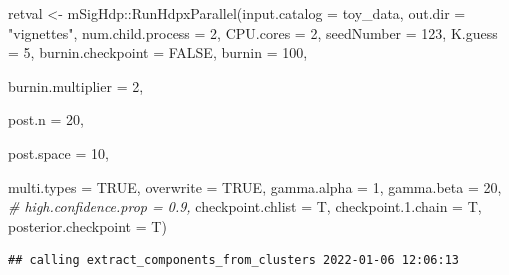 \documentclass[
]{article}
\newenvironment{Shaded}{\begin{snugshade}}{\end{snugshade}}
\newcommand{\AttributeTok}[1]{\textcolor[rgb]{0.77,0.63,0.00}{#1}}
\newcommand{\CommentTok}[1]{\textcolor[rgb]{0.56,0.35,0.01}{\textit{#1}}}
\newcommand{\ConstantTok}[1]{\textcolor[rgb]{0.00,0.00,0.00}{#1}}
\newcommand{\DecValTok}[1]{\textcolor[rgb]{0.00,0.00,0.81}{#1}}
\newcommand{\FunctionTok}[1]{\textcolor[rgb]{0.00,0.00,0.00}{#1}}
\newcommand{\NormalTok}[1]{#1}
\newcommand{\OtherTok}[1]{\textcolor[rgb]{0.56,0.35,0.01}{#1}}
\newcommand{\SpecialCharTok}[1]{\textcolor[rgb]{0.00,0.00,0.00}{#1}}
\newcommand{\StringTok}[1]{\textcolor[rgb]{0.31,0.60,0.02}{#1}}
\begin{document}
\begin{Shaded}
\begin{Highlighting}[]
\NormalTok{retval }\OtherTok{\textless{}{-}}\NormalTok{ mSigHdp}\SpecialCharTok{::}\FunctionTok{RunHdpxParallel}\NormalTok{(}\AttributeTok{input.catalog =}\NormalTok{ toy\_data,}
                          \AttributeTok{out.dir                  =} \StringTok{"vignettes"}\NormalTok{,}
                          \AttributeTok{num.child.process        =} \DecValTok{2}\NormalTok{, }
                          \AttributeTok{CPU.cores                =} \DecValTok{2}\NormalTok{,}
                          \AttributeTok{seedNumber               =} \DecValTok{123}\NormalTok{,}
                          \AttributeTok{K.guess                  =} \DecValTok{5}\NormalTok{,}
                          \AttributeTok{burnin.checkpoint        =} \ConstantTok{FALSE}\NormalTok{,}
                          \AttributeTok{burnin                   =} \DecValTok{100}\NormalTok{, }
                          
                          \AttributeTok{burnin.multiplier        =} \DecValTok{2}\NormalTok{,}
                         
                          \AttributeTok{post.n                   =} \DecValTok{20}\NormalTok{, }
                          
                          \AttributeTok{post.space               =} \DecValTok{10}\NormalTok{, }
                          
                          \AttributeTok{multi.types              =} \ConstantTok{TRUE}\NormalTok{,}
                          \AttributeTok{overwrite                =} \ConstantTok{TRUE}\NormalTok{,}
                          \AttributeTok{gamma.alpha              =} \DecValTok{1}\NormalTok{,}
                          \AttributeTok{gamma.beta               =} \DecValTok{20}\NormalTok{, }
                         \CommentTok{\# high.confidence.prop     = 0.9,}
                          \AttributeTok{checkpoint.chlist        =}\NormalTok{ T,}
                          \AttributeTok{checkpoint.1.chain       =}\NormalTok{ T,}
                          \AttributeTok{posterior.checkpoint     =}\NormalTok{ T) }
\end{Highlighting}
\end{Shaded}

\begin{verbatim}
## calling extract_components_from_clusters 2022-01-06 12:06:13
\end{verbatim}
\end{document}
